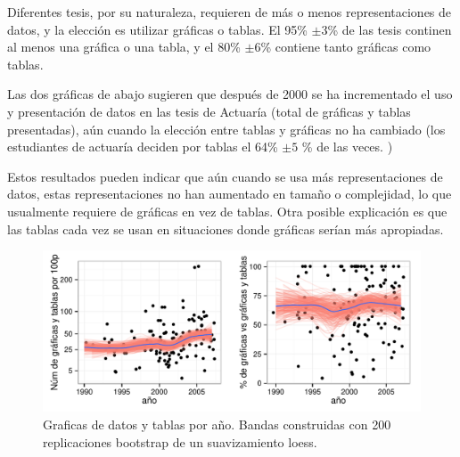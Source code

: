 \documentclass{tufte-handout}\usepackage{graphicx, color}
\begin{document}
Diferentes tesis, por su naturaleza, requieren de más o menos representaciones
de datos, y la elección es utilizar gráficas o tablas. 
El 95\% ${\pm 3}$\% de las tesis continen al menos una gráfica o una tabla,
y el 80\% ${\pm 6}$\% contiene
tanto gráficas como tablas.



Las dos gráficas de abajo sugieren que después de 2000 se ha incrementado
el uso y presentación 
de datos en las tesis de Actuaría (total de gráficas y tablas presentadas),
aún cuando la elección entre tablas y gráficas no ha cambiado (los estudiantes de actuaría deciden por tablas el  64\% ${\pm 5}$ \% de las veces. )

Estos resultados pueden indicar que aún cuando se usa más representaciones de datos,
estas representaciones no han aumentado en tamaño o complejidad, lo que usualmente
requiere de gráficas en vez de tablas. Otra posible explicación es que las
tablas cada vez se usan en situaciones donde gráficas serían más apropiadas.



\begin{figure}[!h]
\centering
\includegraphics[width=12cm]{./figure/grafpor.pdf}
\caption{Graficas de datos y tablas por año. Bandas construidas con 200 replicaciones
bootstrap de un suavizamiento loess.}
\end{figure}








\end{document}
